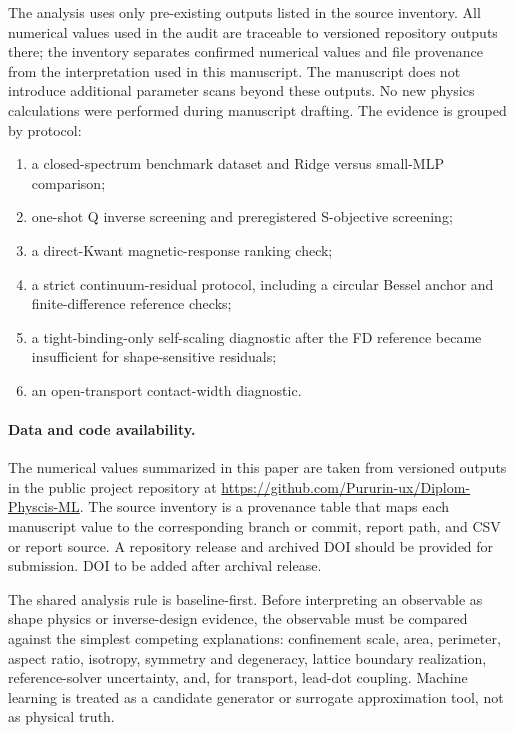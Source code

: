 The analysis uses only pre-existing outputs listed in the source inventory. All
numerical values used in the audit are traceable to versioned repository outputs
there; the inventory separates confirmed numerical values and file provenance
from the interpretation used in this manuscript. The manuscript does not
introduce additional parameter scans beyond these outputs. No new physics
calculations were performed during manuscript drafting. The evidence is
grouped by protocol:

\begin{enumerate}
    \item a closed-spectrum benchmark dataset and Ridge versus small-MLP
    comparison;
    \item one-shot Q inverse screening and preregistered S-objective screening;
    \item a direct-Kwant magnetic-response ranking check;
    \item a strict continuum-residual protocol, including a circular
    Bessel anchor and finite-difference reference checks;
    \item a tight-binding-only self-scaling diagnostic after the FD reference became
    insufficient for shape-sensitive residuals;
    \item an open-transport contact-width diagnostic.
\end{enumerate}

\paragraph*{Data and code availability.}
The numerical values summarized in this paper are taken from versioned outputs
in the public project repository at
\url{https://github.com/Pururin-ux/Diplom-Physcis-ML}. The source inventory is a
provenance table that maps each manuscript value to the corresponding branch or
commit, report path, and CSV or report source. A repository release and archived
DOI should be provided for submission. DOI to be added after archival release.

The shared analysis rule is baseline-first. Before interpreting an observable
as shape physics or inverse-design evidence, the observable must be compared
against the simplest competing explanations: confinement scale, area, perimeter,
aspect ratio, isotropy, symmetry and degeneracy, lattice boundary realization,
reference-solver uncertainty, and, for transport, lead-dot coupling. Machine
learning is treated as a candidate generator or surrogate approximation tool,
not as physical truth.
